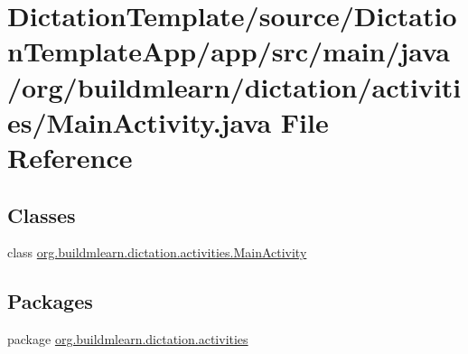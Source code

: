 \hypertarget{DictationTemplate_2source_2DictationTemplateApp_2app_2src_2main_2java_2org_2buildmlearn_2dictatie38e07d6063741dc1656d8ad93c19d73}{}\section{Dictation\+Template/source/\+Dictation\+Template\+App/app/src/main/java/org/buildmlearn/dictation/activities/\+Main\+Activity.java File Reference}
\label{DictationTemplate_2source_2DictationTemplateApp_2app_2src_2main_2java_2org_2buildmlearn_2dictatie38e07d6063741dc1656d8ad93c19d73}
\subsection*{Classes}
\begin{DoxyCompactItemize}
\item 
class \hyperlink{classorg_1_1buildmlearn_1_1dictation_1_1activities_1_1MainActivity}{org.\+buildmlearn.\+dictation.\+activities.\+Main\+Activity}
\end{DoxyCompactItemize}
\subsection*{Packages}
\begin{DoxyCompactItemize}
\item 
package \hyperlink{namespaceorg_1_1buildmlearn_1_1dictation_1_1activities}{org.\+buildmlearn.\+dictation.\+activities}
\end{DoxyCompactItemize}
